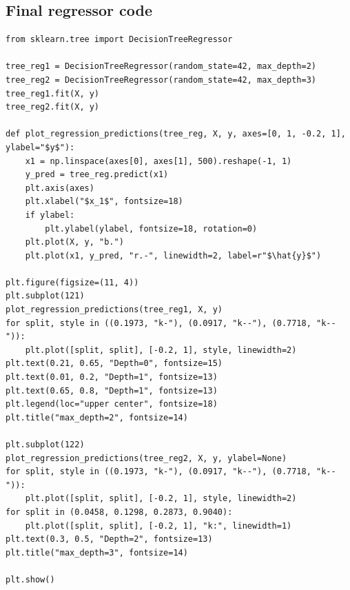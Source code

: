 \documentclass[%
oneside,                 %
final,                   %
10pt]{article}
\begin{document}
\subsection*{Final regressor code}
\begin{verbatim}
from sklearn.tree import DecisionTreeRegressor

tree_reg1 = DecisionTreeRegressor(random_state=42, max_depth=2)
tree_reg2 = DecisionTreeRegressor(random_state=42, max_depth=3)
tree_reg1.fit(X, y)
tree_reg2.fit(X, y)

def plot_regression_predictions(tree_reg, X, y, axes=[0, 1, -0.2, 1], ylabel="$y$"):
    x1 = np.linspace(axes[0], axes[1], 500).reshape(-1, 1)
    y_pred = tree_reg.predict(x1)
    plt.axis(axes)
    plt.xlabel("$x_1$", fontsize=18)
    if ylabel:
        plt.ylabel(ylabel, fontsize=18, rotation=0)
    plt.plot(X, y, "b.")
    plt.plot(x1, y_pred, "r.-", linewidth=2, label=r"$\hat{y}$")

plt.figure(figsize=(11, 4))
plt.subplot(121)
plot_regression_predictions(tree_reg1, X, y)
for split, style in ((0.1973, "k-"), (0.0917, "k--"), (0.7718, "k--")):
    plt.plot([split, split], [-0.2, 1], style, linewidth=2)
plt.text(0.21, 0.65, "Depth=0", fontsize=15)
plt.text(0.01, 0.2, "Depth=1", fontsize=13)
plt.text(0.65, 0.8, "Depth=1", fontsize=13)
plt.legend(loc="upper center", fontsize=18)
plt.title("max_depth=2", fontsize=14)

plt.subplot(122)
plot_regression_predictions(tree_reg2, X, y, ylabel=None)
for split, style in ((0.1973, "k-"), (0.0917, "k--"), (0.7718, "k--")):
    plt.plot([split, split], [-0.2, 1], style, linewidth=2)
for split in (0.0458, 0.1298, 0.2873, 0.9040):
    plt.plot([split, split], [-0.2, 1], "k:", linewidth=1)
plt.text(0.3, 0.5, "Depth=2", fontsize=13)
plt.title("max_depth=3", fontsize=14)

plt.show()
\end{verbatim}
\end{document}
